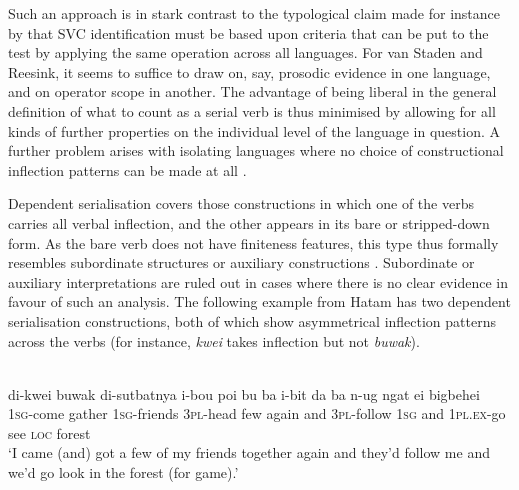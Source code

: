 Such an approach is in stark contrast to the typological claim made for instance by \citet{haspelmath2016serial} that SVC identification must be based upon criteria that can be put to the test by applying the same operation across all languages. For van Staden and Reesink, it seems to suffice to draw on, say, prosodic evidence in one language, and on operator scope in another. The advantage of being liberal in the general definition of what to count as a serial verb is thus minimised by allowing for all kinds of further properties on the individual level of the language in question. A further problem arises with isolating languages where no choice of constructional inflection patterns can be made at all \citep[23]{vanstaden2008serial}.

Dependent serialisation covers those constructions in which one of the verbs carries all verbal inflection, and the other appears in its bare or stripped-down form. As the bare verb does not have finiteness features, this type thus formally resembles subordinate structures or auxiliary constructions \citep[24]{vanstaden2008serial}. Subordinate or auxiliary interpretations are ruled out in cases where there is no clear evidence in favour of such an analysis. The following example from Hatam has two dependent serialisation constructions, both of which show asymmetrical inflection patterns across the verbs (for instance, \textit{kwei} takes inflection but not \textit{buwak}).

\ea 
{}\\
\gll di-kwei buwak di-sutbatnya i-bou poi bu ba i-bit da ba n-ug ngat ei bigbehei \\
\textsc{1}\textsc{sg}-come gather \textsc{1}\textsc{sg}-friends \textsc{3}\textsc{pl}-head few again and \textsc{3}\textsc{pl}-follow \textsc{1}\textsc{sg} and \textsc{1}\textsc{pl}.\textsc{ex}-go see \textsc{loc} forest \\
\glft `I came (and) got a few of my friends together again and they'd follow me and we'd go look in the forest (for game).'\\ 
\z

